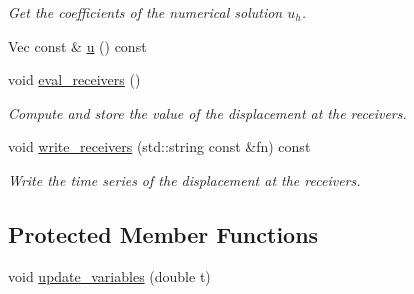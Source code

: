 \begin{DoxyCompactItemize}
\begin{DoxyCompactList}\small\item\em Get the coefficients of the numerical solution $u_h$. \end{DoxyCompactList}\item 
Vec const \& \hyperlink{classTspeed_1_1TimeAdvance_a3c27a46c3be458c4c6b9b7802c58a30b}{u} () const 
\item 
void \hyperlink{classTspeed_1_1TimeAdvance_aa4b4c155a949f5629e49da06a13e2672}{eval\-\_\-receivers} ()
\begin{DoxyCompactList}\small\item\em Compute and store the value of the displacement at the receivers. \end{DoxyCompactList}\item 
void \hyperlink{classTspeed_1_1TimeAdvance_a4030ab6e3606e5b762d236a4bc65fe68}{write\-\_\-receivers} (std\-::string const \&fn) const 
\begin{DoxyCompactList}\small\item\em Write the time series of the displacement at the receivers. \end{DoxyCompactList}\end{DoxyCompactItemize}
\subsection*{Protected Member Functions}
\begin{DoxyCompactItemize}
\item 
void \hyperlink{classTspeed_1_1TimeAdvance_ac083260ffe62e2a3eff1c1ab6068a1ad}{update\-\_\-variables} (double t)
\end{DoxyCompactItemize}

